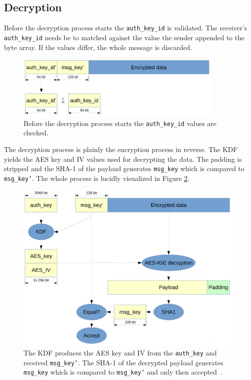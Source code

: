 \documentclass[thesis=M,english]{FITthesis}[2012/10/20]
\begin{document}
\subsection{Decryption}\label{crypto-regular-dec}

Before the decryption process starts the \texttt{auth\_key\_id} is validated. The receiver's \texttt{auth\_key\_id} needs be to matched against the value the sender appended to the byte array. If the values differ, the whole message is discarded.

\begin{figure}[htb]
	\centering
	\includegraphics[width=0.9\textwidth]{mtproto-auth-key.pdf}
	\caption[Message acceptance check]{Before the decryption process starts the \texttt{auth\_key\_id} values are checked.}
	\label{img:crypto-regular-dec}
\end{figure}

The decryption process is plainly the encryption process in reverse. The KDF yields the AES key and IV values used for decrypting the data. The padding is stripped and the SHA-1 of the payload generates \texttt{msg\_key} which is compared to \texttt{msg\_key'}. The whole process is lucidly visualized in Figure \ref{img:telegram-decflow}.

\begin{figure}[htb]
	\centering
	\includegraphics[width=1\textwidth]{mtproto-decflow.pdf}
	\caption[MTProto decryption flow]{The KDF produces the AES key and IV from the \texttt{auth\_key} and received \texttt{msg\_key'}. The SHA-1 of the decrypted payload generates \texttt{msg\_key} which is compared to \texttt{msg\_key'} and only then accepted~\cite{telegram-aarhus}.}
	\label{img:telegram-decflow}
\end{figure}
\end{document}
